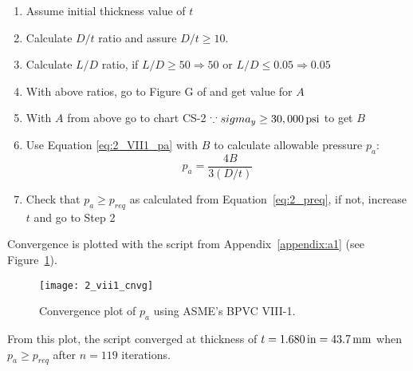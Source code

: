 \begin{enumerate}
	\item Assume initial thickness value of $t$
	\item Calculate $D/t$ ratio and assure $D/t \geq 10$.
	\item Calculate $L/D$ ratio, if $L/D \geq 50 \Rightarrow 50$ or  $L/D \leq 0.05 \Rightarrow 0.05$
	\item With above ratios, go to Figure G of \cite{ASMEbvpcIID} and get value for $A$
	\item With $A$ from above go to chart CS-2 $\because sigma_y \geq 30,000 \,\mathrm{psi}$ to get $B$
	\item Use Equation \ref{eq:2_VII1_pa} with $B$ to calculate allowable pressure $p_a$:
	      \begin{equation}
	      	\label{eq:2_VII1_pa}
	      	p_a = \frac{4B}{3 \left(D/t\right)}
	      \end{equation}
	\item Check that $p_a \geq p_{req}$ as calculated from Equation~\ref{eq:2_preq}, if not, increase $t$ and go to Step 2\\
	      	
\end{enumerate}

Convergence is plotted with the script from Appendix~\ref{appendix:a1} (see Figure~\ref{fig:2_vii1_cnvg}).
\begin{figure}[H]
	\centering
	\texttt{[image: 2\_vii1\_cnvg]}
	\caption{Convergence plot of $p_a$ using ASME's BPVC VIII-1.}
	\label{fig:2_vii1_cnvg}
\end{figure}

From this plot, the script converged at thickness of $t = 1.680\,\mathrm{in} = 43.7\,\mathrm{mm}$ when $p_a\geq p_{req}$ after $n=119$ iterations. 


